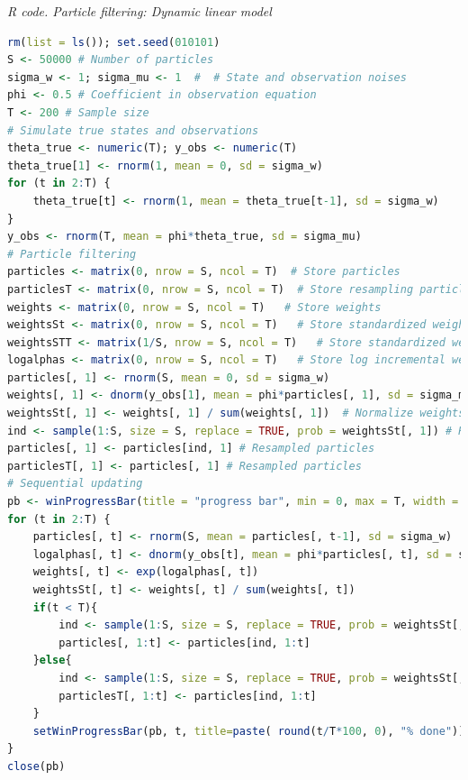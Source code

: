 \begin{tcolorbox}[enhanced,width=4.67in,center upper,
	fontupper=\large\bfseries,drop shadow southwest,sharp corners]
	\textit{R code. Particle filtering: Dynamic linear model}
	\begin{VF}
		\begin{lstlisting}[language=R]
rm(list = ls()); set.seed(010101)
S <- 50000 # Number of particles
sigma_w <- 1; sigma_mu <- 1  #  # State and observation noises
phi <- 0.5 # Coefficient in observation equation
T <- 200 # Sample size
# Simulate true states and observations
theta_true <- numeric(T); y_obs <- numeric(T)
theta_true[1] <- rnorm(1, mean = 0, sd = sigma_w) 
for (t in 2:T) {
	theta_true[t] <- rnorm(1, mean = theta_true[t-1], sd = sigma_w)
}
y_obs <- rnorm(T, mean = phi*theta_true, sd = sigma_mu)
# Particle filtering
particles <- matrix(0, nrow = S, ncol = T)  # Store particles
particlesT <- matrix(0, nrow = S, ncol = T)  # Store resampling particles
weights <- matrix(0, nrow = S, ncol = T)   # Store weights
weightsSt <- matrix(0, nrow = S, ncol = T)   # Store standardized weights
weightsSTT <- matrix(1/S, nrow = S, ncol = T)   # Store standardized weights
logalphas <- matrix(0, nrow = S, ncol = T)   # Store log incremental weights
particles[, 1] <- rnorm(S, mean = 0, sd = sigma_w) 
weights[, 1] <- dnorm(y_obs[1], mean = phi*particles[, 1], sd = sigma_mu)  # Importance weights
weightsSt[, 1] <- weights[, 1] / sum(weights[, 1])  # Normalize weights
ind <- sample(1:S, size = S, replace = TRUE, prob = weightsSt[, 1]) # Resample 
particles[, 1] <- particles[ind, 1] # Resampled particles
particlesT[, 1] <- particles[, 1] # Resampled particles
# Sequential updating
pb <- winProgressBar(title = "progress bar", min = 0, max = T, width = 300)
for (t in 2:T) {
	particles[, t] <- rnorm(S, mean = particles[, t-1], sd = sigma_w)
	logalphas[, t] <- dnorm(y_obs[t], mean = phi*particles[, t], sd = sigma_mu, log = TRUE) 
	weights[, t] <- exp(logalphas[, t])
	weightsSt[, t] <- weights[, t] / sum(weights[, t])
	if(t < T){
		ind <- sample(1:S, size = S, replace = TRUE, prob = weightsSt[, t])
		particles[, 1:t] <- particles[ind, 1:t]
	}else{
		ind <- sample(1:S, size = S, replace = TRUE, prob = weightsSt[, t])
		particlesT[, 1:t] <- particles[ind, 1:t]
	}
	setWinProgressBar(pb, t, title=paste( round(t/T*100, 0), "% done"))
}
close(pb)
\end{lstlisting}
	\end{VF}
\end{tcolorbox} 


